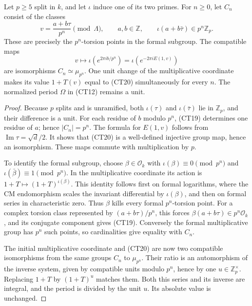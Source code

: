 \begin{proposition}\label{ct-character-normalization}
Let $p\ge5$ split in $k$, and let $\iota$ induce one of its
two primes.  For $n\ge0$, let $C_n$ consist of the classes
\[
 v=\frac{a+b\tau}{p^n}\pmod\Lambda,
 \qquad a,b\in\mathbb Z,\qquad
              \iota(a+b\bar\tau)\in p^n\mathbb Z_p.
 \tag{CT19}
\]
These are precisely the $p^n$-torsion points in the formal
subgroup.  The compatible maps
\[
  v\longmapsto\iota\!\left(e^{2\pi i b/p^n}\right)
      =\iota\!\left(e^{-2\pi iE(1,v)}\right)
 \tag{CT20}
\]
are isomorphisms $C_n\simeq\mu_{p^n}$.  One unit change of
the multiplicative coordinate makes its value $1+T(v)$ equal
to (CT20) simultaneously for every $n$.  The normalized period
$\Omega$ in (CT12) remains a unit.
\end{proposition}
\begin{proof}
Because $p$ splits and is unramified, both
$\iota(\tau)$ and $\iota(\bar\tau)$ lie in $\mathbb Z_p$,
and their difference is a unit.  For each residue of $b$ modulo
$p^n$, (CT19) determines one residue of $a$; hence $|C_n|=p^n$.
The formula for $E(1,v)$ follows from
$\operatorname{Im}\tau=\sqrt d/2$.  It shows that (CT20)
is a well-defined injective group map, hence an isomorphism.
These maps commute with multiplication by $p$.

To identify the formal subgroup, choose
$\beta\in\mathcal O_k$ with
$\iota(\beta)\equiv0\pmod{p^n}$ and
$\iota(\bar\beta)\equiv1\pmod{p^n}$.
In the multiplicative coordinate its action is
$1+T\mapsto(1+T)^{\iota(\beta)}$.
This identity follows first on formal logarithms, where the CM
endomorphism scales the invariant differential by
$\iota(\beta)$, and then on formal series in characteristic
zero.  Thus $\beta$ kills every formal $p^n$-torsion point.
For a complex torsion class represented by $(a+b\tau)/p^n$,
this forces $\beta(a+b\tau)\in p^n\mathcal O_k$, and its
conjugate component gives (CT19).  Conversely the formal
multiplicative group has $p^n$ such points, so cardinalities
give equality with $C_n$.

The initial multiplicative coordinate and (CT20) are now two
compatible isomorphisms from the same groups $C_n$ to
$\mu_{p^n}$.  Their ratio is an automorphism of the inverse
system, given by compatible units modulo $p^n$, hence by one
$u\in\mathbb Z_p^\times$.  Replacing $1+T$ by $(1+T)^u$
matches them.  Both this series and its inverse are integral,
and the period is divided by the unit $u$.  Its absolute value
is unchanged.
\end{proof}

